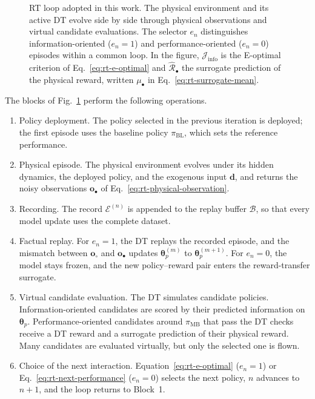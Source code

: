 \documentclass[journal]{IEEEtran}
\begin{document}
\begin{figure}[t]
{\begin{tikzpicture}
\end{tikzpicture}%
}
\caption{RT loop adopted in this work. The physical environment and its active DT evolve side by side through physical observations and virtual candidate evaluations. The selector $e_n$ distinguishes information-oriented ($e_n=1$) and performance-oriented ($e_n=0$) episodes within a common loop. In the figure, $\mathcal J_{\mathrm{info}}$ is the E-optimal criterion of Eq.~\eqref{eq:rt-e-optimal} and $\widehat{\mathcal R}_\bullet$ the surrogate prediction of the physical reward, written $\mu_\bullet$ in Eq.~\eqref{eq:rt-surrogate-mean}.}
\label{fig:rt_framework}
\end{figure}
The blocks of Fig.~\ref{fig:rt_framework} perform the following operations.
\begin{enumerate}
    \item Policy deployment. The policy selected in the previous iteration is deployed; the first episode uses the baseline policy $\pi_{\mathrm{BL}}$, which sets the reference performance.
    \item Physical episode. The physical environment evolves under its hidden dynamics, the deployed policy, and the exogenous input $\mathbf d$, and returns the noisy observations $\mathbf o_{\bullet}$ of Eq.~\eqref{eq:rt-physical-observation}.
    \item Recording. The record $\mathcal E^{(n)}$ is appended to the replay buffer $\mathcal B$, so that every model update uses the complete dataset.
    \item Factual replay. For $e_n=1$, the DT replays the recorded episode, and the mismatch between $\mathbf o_{\circ}$ and $\mathbf o_{\bullet}$ updates $\boldsymbol{\theta}_p^{(m)}$ to $\boldsymbol{\theta}_p^{(m+1)}$. For $e_n=0$, the model stays frozen, and the new policy--reward pair enters the reward-transfer surrogate.
    \item Virtual candidate evaluation. The DT simulates candidate policies. Information-oriented candidates are scored by their predicted information on $\boldsymbol{\theta}_p$. Performance-oriented candidates around $\pi_{\mathrm{MB}}$ that pass the DT checks receive a DT reward and a surrogate prediction of their physical reward. Many candidates are evaluated virtually, but only the selected one is flown.
    \item Choice of the next interaction. Equation~\eqref{eq:rt-e-optimal} ($e_n=1$) or Eq.~\eqref{eq:rt-next-performance} ($e_n=0$) selects the next policy, $n$ advances to $n+1$, and the loop returns to Block~1.
\end{enumerate}
\end{document}
